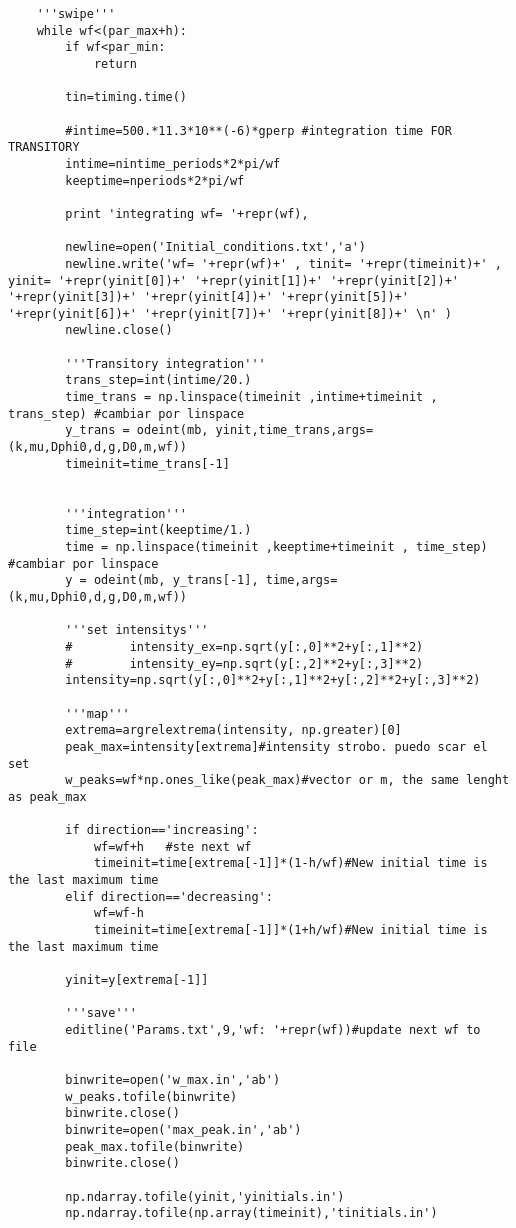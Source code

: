 \begin{lstlisting}
	'''swipe''' 
	while wf<(par_max+h):
		if wf<par_min:
			return
	
		tin=timing.time()
		
		#intime=500.*11.3*10**(-6)*gperp #integration time FOR TRANSITORY  
		intime=nintime_periods*2*pi/wf
		keeptime=nperiods*2*pi/wf
		
		print 'integrating wf= '+repr(wf), 
		
		newline=open('Initial_conditions.txt','a')
		newline.write('wf= '+repr(wf)+' , tinit= '+repr(timeinit)+' , yinit= '+repr(yinit[0])+' '+repr(yinit[1])+' '+repr(yinit[2])+' '+repr(yinit[3])+' '+repr(yinit[4])+' '+repr(yinit[5])+' '+repr(yinit[6])+' '+repr(yinit[7])+' '+repr(yinit[8])+' \n' )          
		newline.close()
		
		'''Transitory integration'''
		trans_step=int(intime/20.)
		time_trans = np.linspace(timeinit ,intime+timeinit , trans_step) #cambiar por linspace
		y_trans = odeint(mb, yinit,time_trans,args=(k,mu,Dphi0,d,g,D0,m,wf))
		timeinit=time_trans[-1]
		
		
		'''integration'''
		time_step=int(keeptime/1.)
		time = np.linspace(timeinit ,keeptime+timeinit , time_step) #cambiar por linspace
		y = odeint(mb, y_trans[-1], time,args=(k,mu,Dphi0,d,g,D0,m,wf))
		
		'''set intensitys'''
		#        intensity_ex=np.sqrt(y[:,0]**2+y[:,1]**2)
		#        intensity_ey=np.sqrt(y[:,2]**2+y[:,3]**2)
		intensity=np.sqrt(y[:,0]**2+y[:,1]**2+y[:,2]**2+y[:,3]**2)
		
		'''map'''
		extrema=argrelextrema(intensity, np.greater)[0]
		peak_max=intensity[extrema]#intensity strobo. puedo scar el set
		w_peaks=wf*np.ones_like(peak_max)#vector or m, the same lenght as peak_max     
		
		if direction=='increasing':
			wf=wf+h   #ste next wf
			timeinit=time[extrema[-1]]*(1-h/wf)#New initial time is the last maximum time
		elif direction=='decreasing':
			wf=wf-h
			timeinit=time[extrema[-1]]*(1+h/wf)#New initial time is the last maximum time
		
		yinit=y[extrema[-1]]
		
		'''save'''
		editline('Params.txt',9,'wf: '+repr(wf))#update next wf to file
		
		binwrite=open('w_max.in','ab')
		w_peaks.tofile(binwrite)
		binwrite.close()
		binwrite=open('max_peak.in','ab')
		peak_max.tofile(binwrite)
		binwrite.close()
		
		np.ndarray.tofile(yinit,'yinitials.in')
		np.ndarray.tofile(np.array(timeinit),'tinitials.in')
		

\end{lstlisting}
